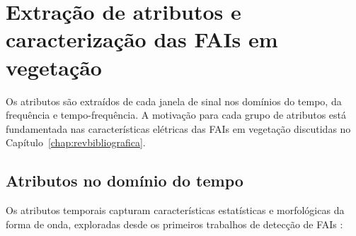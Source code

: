\section{Extração de atributos e caracterização das FAIs em vegetação}\label{sec:met_features}

Os atributos são extraídos de cada janela de sinal nos domínios do tempo, da frequência e tempo-frequência. A motivação para cada grupo de atributos está fundamentada nas características elétricas das FAIs em vegetação discutidas no Capítulo~\ref{chap:revbibliografica}.

\subsection{Atributos no domínio do tempo}

Os atributos temporais capturam características estatísticas e morfológicas da forma de onda, exploradas desde os primeiros trabalhos de detecção de FAIs \cite{4, 5}:

